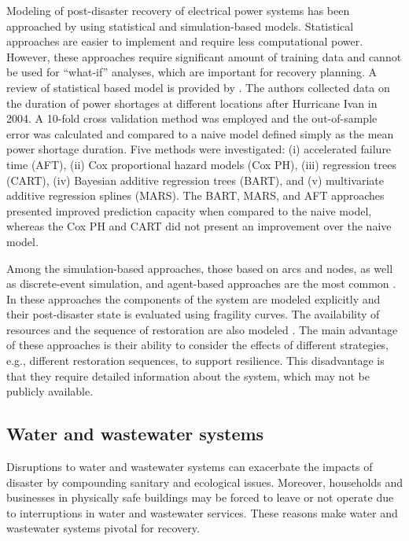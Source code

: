 Modeling of post-disaster recovery of electrical power systems has been approached by using statistical and simulation-based models. Statistical approaches are easier to implement and require less computational power. However, these approaches require significant amount of training data and cannot be used for ``what-if'' analyses, which are important for recovery planning. A review of statistical based model is provided by \cite{liu2007statistical}. The authors collected data on the duration of power shortages at different locations after Hurricane Ivan in 2004. A 10-fold cross validation method was employed and the out-of-sample error was calculated and compared to a naive model defined simply as the mean power shortage duration. Five methods were investigated: (i) accelerated failure time (AFT), (ii) Cox proportional hazard models (Cox PH), (iii) regression trees (CART), (iv) Bayesian additive regression trees (BART), and (v) multivariate additive regression splines (MARS). The BART, MARS, and AFT approaches presented improved prediction capacity when compared to the naive model, whereas the Cox PH and CART did not present an improvement over the naive model. \ 

Among the simulation-based approaches, those based on arcs and nodes, as well as discrete-event simulation, and agent-based approaches are the most common \citep{Eusgeld2008a,ouyang2014review,sun2019resilience}. In these approaches the components of the system are modeled explicitly and their post-disaster state is evaluated using fragility curves. The availability of resources and the sequence of restoration are also modeled \citep{ouyang2014multi}. The main advantage of these approaches is their ability to consider the effects of different strategies, e.g., different restoration sequences, to support resilience. This disadvantage is that they require detailed information about the system, which may not be publicly available. \ 

\subsection{Water and wastewater systems}
Disruptions to water and wastewater systems can exacerbate the impacts of disaster by compounding sanitary and ecological issues. Moreover, households and businesses in physically safe buildings may be forced to leave or not operate due to interruptions in water and wastewater services. These reasons make water and wastewater systems pivotal for recovery.\

